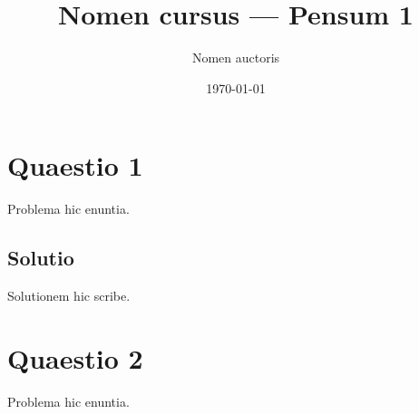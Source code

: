 \documentclass[11pt]{article}
\title{Nomen cursus — Pensum 1}
\author{Nomen auctoris}
\date{\today}
\begin{document}
\maketitle

\section*{Quaestio 1}
Problema hic enuntia.

\subsection*{Solutio}
Solutionem hic scribe.

\section*{Quaestio 2}
Problema hic enuntia.
\end{document}

